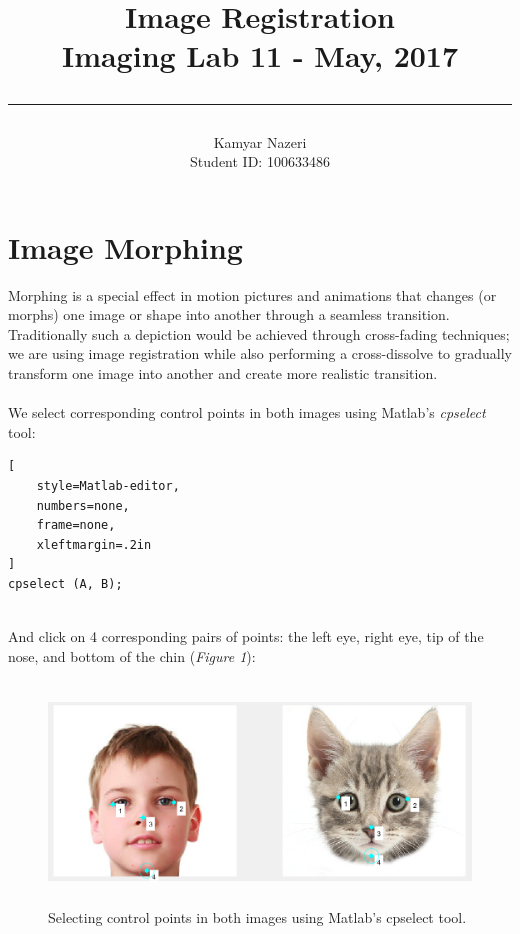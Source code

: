 \documentclass[a4paper,11pt]{article}
\begin{document}
\title{
	\Huge \textbf {Image Registration}
    \\ [0.2cm]
	\LARGE Imaging Lab 11 - May, 2017
    \\ [0.5cm]
    \hrule
}

\date{}

\author{
		\Large Kamyar Nazeri \\
		\large Student ID: 100633486 }

\maketitle
\newpage

\section*{Image Morphing}
Morphing is a special effect in motion pictures and animations that changes (or morphs) one image or shape into another through a seamless transition. Traditionally such a depiction would be achieved through cross-fading techniques; we are using image registration while also performing a cross-dissolve to gradually transform one image into another and create more realistic transition. \\\\
We select corresponding control points in both images using Matlab's \emph{cpselect} tool:

\begin{lstlisting}[
    style=Matlab-editor,
    numbers=none,
    frame=none,
    xleftmargin=.2in
]
cpselect (A, B);
\end{lstlisting}
 \\
And click on 4 corresponding pairs of points: the left eye, right eye, tip of the nose, and bottom of the chin (\emph{Figure 1}):

\begin{figure}[!htb]
  \centering
  \includegraphics[width=14cm, height=5.9cm]{2.png}
  \caption{\small Selecting control points in both images using Matlab's cpselect tool.}
\end{figure}
\end{document}
